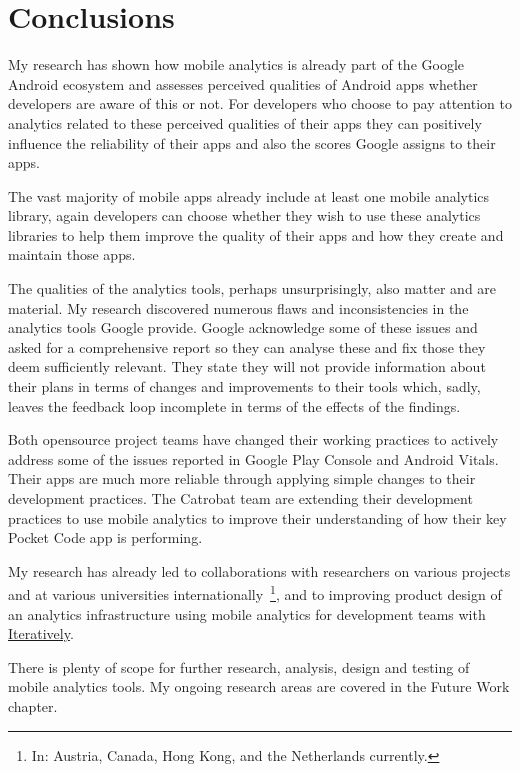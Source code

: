 \chapter{Conclusions}
My research has shown how mobile analytics is already part of the Google Android ecosystem and assesses perceived qualities of Android apps whether developers are aware of this or not. For developers who choose to pay attention to analytics related to these perceived qualities of their apps they can positively influence the reliability of their apps and also the scores Google assigns to their apps. 

The vast majority of mobile apps already include at least one mobile analytics library, again developers can choose whether they wish to use these analytics libraries to help them improve the quality of their apps and how they create and maintain those apps. 

The qualities of the analytics tools, perhaps unsurprisingly, also matter and are material. My research discovered numerous flaws and inconsistencies in the analytics tools Google provide. Google acknowledge some of these issues and asked for a comprehensive report so they can analyse these and fix those they deem sufficiently relevant. They state they will not provide information about their plans in terms of changes and improvements to their tools which, sadly, leaves the feedback loop incomplete in terms of the effects of the findings.

Both opensource project teams have changed their working practices to actively address some of the issues reported in Google Play Console and Android Vitals. Their apps are much more reliable through applying simple changes to their development practices. The Catrobat team are extending their development practices to use mobile analytics to improve their understanding of how their key Pocket Code app is performing.

My research has already led to collaborations with researchers on various projects and at various universities internationally~\footnote{In: Austria, Canada, Hong Kong, and the Netherlands currently.}, and to improving product design of an analytics infrastructure using mobile analytics for development teams with \href{https://iterative.ly/}{Iteratively}. 

There is plenty of scope for further research, analysis, design and testing of mobile analytics tools. My ongoing research areas are covered in the Future Work chapter.


